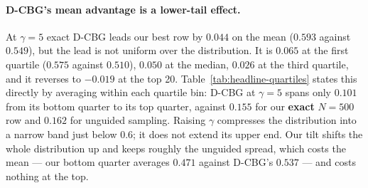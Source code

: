 \documentclass[11pt]{article}
\begin{document}
\begin{table}[h]
\centering
\caption{QED distribution over the novel set, same runs as
Table~\ref{tab:headline}. \emph{Novel} and $>0.6$ are counts out of 1024
generated samples; \emph{Top-20} is the mean of the 20 best novel molecules, so
it is matched on generation budget rather than on novel count.
\emph{Max}$_{78}$ is the mean maximum of a random 78-molecule subsample (4000
draws, 78 = the smallest novel count in the table), which is the max column made
comparable across rows --- the raw \emph{Max} is not, since it grows with the
novel count and the rows differ by $4.7\times$ in it. Bold marks the best value
in each column at printed precision.}
\label{tab:headline-dist}
\footnotesize
\setlength{\tabcolsep}{3pt}

\end{table}

\paragraph{D-CBG's mean advantage is a lower-tail effect.}
At $\gamma = 5$ exact D-CBG leads our best row by $0.044$ on the mean
($0.593$ against $0.549$), but the lead is not uniform over the distribution. It
is $0.065$ at the first quartile ($0.575$ against $0.510$), $0.050$ at the
median, $0.026$ at the third quartile, and it reverses to $-0.019$ at the top 20.
Table~\ref{tab:headline-quartiles} states this directly by averaging within each
quartile bin: D-CBG at $\gamma = 5$ spans only $0.101$ from its bottom quarter to
its top quarter, against $0.155$ for our \textbf{exact} $N{=}500$ row and $0.162$
for unguided sampling. Raising $\gamma$ compresses the distribution into a narrow
band just below $0.6$; it does not extend its upper end. Our tilt shifts the
whole distribution up and keeps roughly the unguided spread, which costs the mean
--- our bottom quarter averages $0.471$ against D-CBG's $0.537$ --- and costs
nothing at the top.

\begin{table}[h]
\centering
\caption{Mean novel QED within each quartile bin, and the gap between the top and
bottom bins (\emph{Spread}). Guidance strength buys D-CBG its mean by shrinking
the spread; ours preserves it.}
\label{tab:headline-quartiles}
\small
\setlength{\tabcolsep}{5pt}

\end{table}
\end{document}
